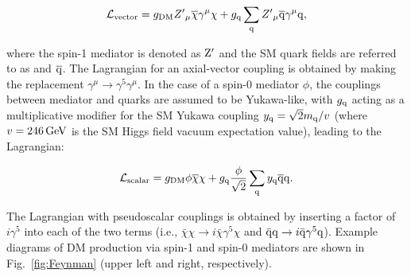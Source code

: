 \begin{equation*}
\mathcal{L}_{\text{vector}} = g_{\rm DM} {Z'}_{\mu}\overline{\chi}\gamma^{\mu}\chi  + g_{\mathrm{q}} \sum_{\mathrm{q}} {Z'}_{\mu} \overline{\mathrm{q}}\gamma^{\mu}\mathrm{q},
\end{equation*}

\noindent where the spin-1 mediator is denoted as $\mathrm{Z}'$ and the SM quark fields are referred to as \PQq and $\overline{\mathrm{q}}$.
The Lagrangian for an axial-vector coupling is obtained by making the replacement $\gamma^\mu\rightarrow\gamma^5\gamma^\mu$.
In the case of a spin-0 mediator $\phi$, the couplings between mediator and quarks are assumed to be Yukawa-like, with $g_{\mathrm{q}}$ acting as a 
multiplicative modifier for the SM Yukawa coupling ${y_{\mathrm{q}} = \sqrt{2}m_{\mathrm{q}}/v}$ (where $v = 246 \,\text{Ge\hspace{-.08em}V}$ is the SM Higgs field vacuum expectation value),
leading to the Lagrangian:

\begin{equation*}
\mathcal{L}_{\text{scalar}} = g_{\rm DM} {\phi}\overline{\chi}\chi  + g_{\mathrm{q}} \frac{\phi}{\sqrt{2}}\sum_{\mathrm{q}} y_{\mathrm{q}} \overline{\mathrm{q}}\mathrm{q}.
\end{equation*}

\noindent The Lagrangian with pseudoscalar couplings is obtained by inserting a factor of $i\gamma^5$ into each of the two terms (i.e., $\bar\chi\chi \to i\bar\chi\gamma^5\chi$ and $\bar {\mathrm{q}} \mathrm{q} \to i\bar {\mathrm{q}}\gamma^5 \mathrm{q}$). Example diagrams of DM production via spin-1 and spin-0 mediators are shown in Fig.~\ref{fig:Feynman} (upper left and right, respectively).

